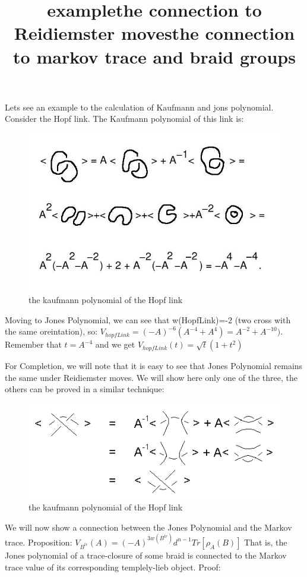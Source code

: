 \documentclass{article}
\begin{document}
{\title{example}
Lets see an example to the calculation of Kaufmann and jons polynomial. Consider the Hopf link.
The Kaufmann polynomial of this link is:
\begin{figure}
\includegraphics[scale=0.15]{hopf_link} 
\caption{the kaufmann polynomial of the Hopf link}
\end{figure}

Moving to Jones Polynomial, we can see that w(HopfLink)=-2 (two cross with the same oreintation), so:
\(V_{hopfLink}=(-A)^{-6}(A^{-4}+A^{4}) = A^{-2} + A^{-10})\).
Remember that \(t = A^{-4}\) and we get \(V_{hopfLink}(t)=\sqrt{t}(1+t^{2})\)  



\title{the connection to Reidiemster moves}
For Completion, we will note that it is easy to see that Jones Polynomial remains the same
under Reidiemster moves. We will show here only one of the three, the others can be proved in a similar technique:
\begin{figure}
\includegraphics[scale=1]{jones_and_reidimister.jpg} 
\caption{the kaufmann polynomial of the Hopf link}
\end{figure}  


\title{the connection to markov trace and braid groups}
We will now show a connection between the Jones Polynomial and the Markov trace.
Proposition:
\(V_{B^{tr}}(A) = (-A)^{3w(B^{tr})}d^{n-1}Tr[\rho_{A}(B)]\)
That is, the Jones polynomial of a trace-closure of some braid is connected to the Markov trace value of its corresponding templely-lieb object.
Proof:

}
\end{document}
